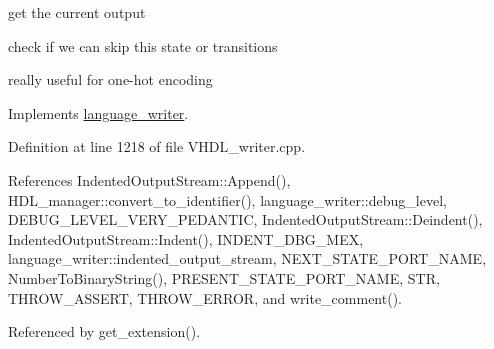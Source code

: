 get the current output

check if we can skip this state or transitions

really useful for one-\/hot encoding 

Implements \hyperlink{classlanguage__writer_a1eb41e600406aea66d35f6da5ef16098}{language\+\_\+writer}.



Definition at line 1218 of file V\+H\+D\+L\+\_\+writer.\+cpp.



References Indented\+Output\+Stream\+::\+Append(), H\+D\+L\+\_\+manager\+::convert\+\_\+to\+\_\+identifier(), language\+\_\+writer\+::debug\+\_\+level, D\+E\+B\+U\+G\+\_\+\+L\+E\+V\+E\+L\+\_\+\+V\+E\+R\+Y\+\_\+\+P\+E\+D\+A\+N\+T\+IC, Indented\+Output\+Stream\+::\+Deindent(), Indented\+Output\+Stream\+::\+Indent(), I\+N\+D\+E\+N\+T\+\_\+\+D\+B\+G\+\_\+\+M\+EX, language\+\_\+writer\+::indented\+\_\+output\+\_\+stream, N\+E\+X\+T\+\_\+\+S\+T\+A\+T\+E\+\_\+\+P\+O\+R\+T\+\_\+\+N\+A\+ME, Number\+To\+Binary\+String(), P\+R\+E\+S\+E\+N\+T\+\_\+\+S\+T\+A\+T\+E\+\_\+\+P\+O\+R\+T\+\_\+\+N\+A\+ME, S\+TR, T\+H\+R\+O\+W\+\_\+\+A\+S\+S\+E\+RT, T\+H\+R\+O\+W\+\_\+\+E\+R\+R\+OR, and write\+\_\+comment().



Referenced by get\+\_\+extension().


